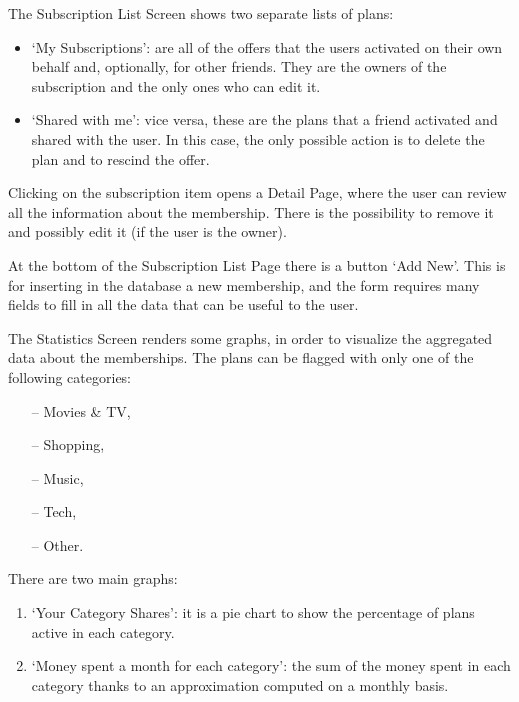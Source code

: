 \documentclass[12pt]{article}
\begin{document}
\vspace{0.5cm}
\vspace{0.2cm}

\noindent The Subscription List Screen shows two separate lists of plans: \begin{itemize}
    \item `My Subscriptions': are all of the offers that the users activated on their own behalf and, optionally, for other friends. They are the owners of the subscription and the only ones who can edit it.
    \item `Shared with me': vice versa, these are the plans that a friend activated and shared with the user. In this case, the only possible action is to delete the plan and to rescind the offer.
\end{itemize}

Clicking on the subscription item opens a Detail Page, where the user can review all the information about the membership. There is the possibility to remove it and possibly edit it (if the user is the owner).

At the bottom of the Subscription List Page there is a button `Add New'. This is for inserting in the database a new membership, and the form requires many fields to fill in all the data that can be useful to the user.

\vspace{0.5cm}
\vspace{0.2cm}

\noindent The Statistics Screen renders some graphs, in order to visualize the aggregated data about the memberships. The plans can be flagged with only one of the following categories:
\begin{itemize}
    \item[--] Movies \& TV,
    \item[--] Shopping,
    \item[--] Music,
    \item[--] Tech,
    \item[--] Other.
\end{itemize}

\noindent There are two main graphs: \begin{enumerate}
    \item `Your Category Shares': it is a pie chart to show the percentage of plans active in each category.
    \item `Money spent a month for each category': the sum of the money spent in each category thanks to an approximation computed on a monthly basis.
\end{enumerate}
\end{document}
